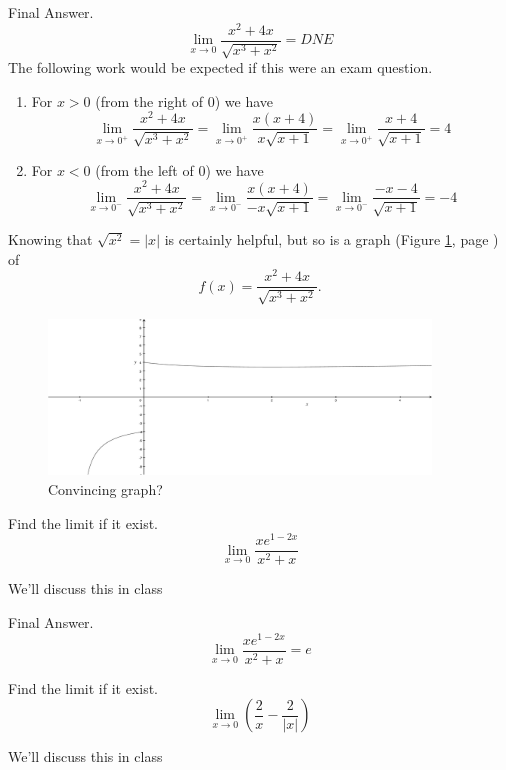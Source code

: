 \documentclass[12pt,addpoints, answers, fleqn]{exam}
\begin{document}
\begin{questions}
\begin{solution}
Final Answer.
\[
\lim_{x \to 0}  \frac{x^2+4x}{\sqrt{x^3+x^2}}=DNE
\]
The following work would be expected if this were an exam question.
\begin{enumerate}
\item For $x > 0$ (from the right of $0$) we have
\[
\lim_{x \to 0^+}  \frac{x^2+4x}{\sqrt{x^3+x^2}}= \lim_{x \to 0^+}  \frac{x \left( x + 4 \right)}{x\sqrt{x+1}} = \lim_{x \to 0^+}  \frac{x + 4}{\sqrt{x+1}} = 4
\]
\item For $x < 0$ (from the left of $0$) we have
\[
\lim_{x \to 0^-}  \frac{x^2+4x}{\sqrt{x^3+x^2}}= \lim_{x \to 0^-}  \frac{x \left( x + 4 \right)}{-x\sqrt{x+1}} = \lim_{x \to 0^-}  \frac{-x - 4}{\sqrt{x+1}} = -4
\]
\end{enumerate}
Knowing that $\sqrt{x^2} = \left| x \right|$ is certainly helpful, but so is a graph (Figure \ref{fig:new005}, page \pageref{fig:new005}) of
\[
f\left( x \right) = \frac{x^2+4x}{\sqrt{x^3+x^2}}.
\]
\end{solution}
\begin{figure}[htbp] %
   \centering
   \includegraphics[width=4in]{./graphics/new005.pdf} 
   \caption{Convincing graph?}
   \label{fig:new005}
\end{figure}



\question Find the limit if it exist.
\[
\mathop {\lim }\limits_{x \to 0}  \frac{x e^{1-2x}}{x^2+x}
\]

\begin{solution}
We'll discuss this in class

Final Answer.
\[
\mathop {\lim }\limits_{x \to 0}  \frac{x e^{1-2x}}{x^2+x} = e
\]
\end{solution}

\question Find the limit if it exist.
\[
\mathop {\lim }\limits_{x \to 0}  \left( \frac{2}{x} - \frac{2}{\left| x \right|} \right)
\]

\begin{solution}
We'll discuss this in class


\end{solution}
\end{questions}
\end{document}
